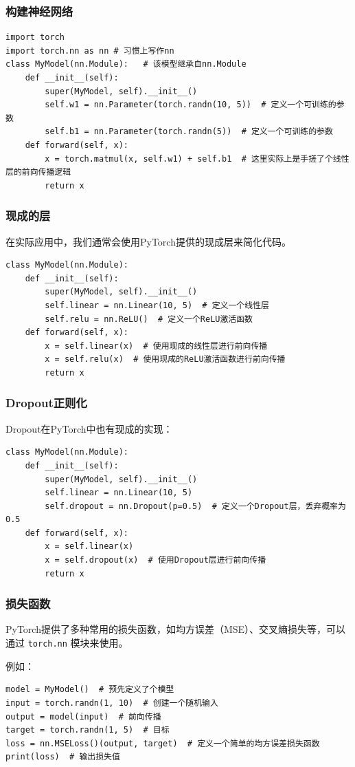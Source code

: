 \begin{frame}[fragile]
    \frametitle{构建神经网络}

    \begin{verbatim}
import torch
import torch.nn as nn # 习惯上写作nn
class MyModel(nn.Module):   # 该模型继承自nn.Module
    def __init__(self):
        super(MyModel, self).__init__()
        self.w1 = nn.Parameter(torch.randn(10, 5))  # 定义一个可训练的参数
        self.b1 = nn.Parameter(torch.randn(5))  # 定义一个可训练的参数
    def forward(self, x):
        x = torch.matmul(x, self.w1) + self.b1  # 这里实际上是手搓了个线性层的前向传播逻辑
        return x
    \end{verbatim}

\end{frame}

\begin{frame}[fragile]
    \frametitle{现成的层}

    在实际应用中，我们通常会使用PyTorch提供的现成层来简化代码。

    \begin{verbatim}
class MyModel(nn.Module):
    def __init__(self):
        super(MyModel, self).__init__()
        self.linear = nn.Linear(10, 5)  # 定义一个线性层
        self.relu = nn.ReLU()  # 定义一个ReLU激活函数
    def forward(self, x):
        x = self.linear(x)  # 使用现成的线性层进行前向传播
        x = self.relu(x)  # 使用现成的ReLU激活函数进行前向传播
        return x
    \end{verbatim}

\end{frame}

\begin{frame}[fragile]
    \frametitle{Dropout正则化}

    Dropout在PyTorch中也有现成的实现：
    \begin{verbatim}
class MyModel(nn.Module):
    def __init__(self):
        super(MyModel, self).__init__()
        self.linear = nn.Linear(10, 5)
        self.dropout = nn.Dropout(p=0.5)  # 定义一个Dropout层，丢弃概率为0.5
    def forward(self, x):
        x = self.linear(x)
        x = self.dropout(x)  # 使用Dropout层进行前向传播
        return x
    \end{verbatim}

\end{frame}

\begin{frame}[fragile]
    \frametitle{损失函数}

    PyTorch提供了多种常用的损失函数，如均方误差（MSE）、交叉熵损失等，可以通过 \texttt{torch.nn} 模块来使用。

    例如：
    \begin{verbatim}
model = MyModel()  # 预先定义了个模型
input = torch.randn(1, 10)  # 创建一个随机输入
output = model(input)  # 前向传播
target = torch.randn(1, 5)  # 目标
loss = nn.MSELoss()(output, target)  # 定义一个简单的均方误差损失函数
print(loss)  # 输出损失值
    \end{verbatim}

\end{frame}

